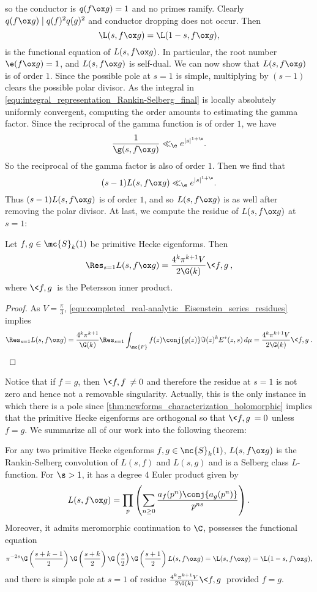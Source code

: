       so the conductor is $q(f \ox g) = 1$ and no primes ramify. Clearly $q(f \ox g) \mid q(f)^{2}q(g)^{2}$ and conductor dropping does not occur. Then
      \[
        \L(s,f \ox g) = \L(1-s,f \ox g),
      \]
      is the functional equation of $L(s,f \ox g)$. In particular, the root number $\e(f \ox g) = 1$, and $L(s,f \ox g)$ is self-dual. We can now show that $L(s,f \ox g)$ is of order $1$. Since the possible pole at $s = 1$ is simple, multiplying by $(s-1)$ clears the possible polar divisor. As the integral in \cref{equ:integral_representation_Rankin-Selberg_final} is locally absolutely uniformly convergent, computing the order amounts to estimating the gamma factor. Since the reciprocal of the gamma function is of order $1$, we have
      \[
        \frac{1}{\g(s,f \ox g)} \ll_{\e} e^{|s|^{1+\e}}.
      \]
      So the reciprocal of the gamma factor is also of order $1$. Then we find that
      \[
        (s-1)L(s,f \ox g) \ll_{\e} e^{|s|^{1+\e}}.
      \]
      Thus $(s-1)L(s,f \ox g)$ is of order $1$, and so $L(s,f \ox g)$ is as well after removing the polar divisor. At last, we compute the residue of $L(s,f \ox g)$ at $s = 1$:

      \begin{proposition}
        Let $f,g \in \mc{S}_{k}(1)$ be primitive Hecke eigenforms. Then
        \[
          \Res_{s = 1}L(s,f \ox g) = \frac{4^{k}\pi^{k+1}V}{2\G(k)}\<f,g\>,
        \]
        where $\<f,g\>$ is the Petersson inner product.
      \end{proposition}
      \begin{proof}
        As $V = \frac{\pi}{3}$, \cref{equ:completed_real-analytic_Eisenstein_series_residues} implies
        \[
          \Res_{s = 1}L(s,f \ox g) = \frac{4^{k}\pi^{k+1}}{\G(k)}\Res_{s = 1}\int_{\mc{F}}f(z)\conj{g(z)}\Im(z)^{k}E^{\ast}(z,s)\,d\mu = \frac{4^{k}\pi^{k+1}V}{2\G(k)}\<f,g\>.
        \]
      \end{proof}

      Notice that if $f = g$, then $\<f,f\> \neq 0$ and therefore the residue at $s = 1$ is not zero and hence not a removable singularity. Actually, this is the only instance in which there is a pole since \cref{thm:newforms_characterization_holomorphic} implies that the primitive Hecke eigenforms are orthogonal so that $\<f,g\> = 0$ unless $f = g$. We summarize all of our work into the following theorem:

      \begin{theorem}
        For any two primitive Hecke eigenforms $f,g \in \mc{S}_{k}(1)$, $L(s,f \ox g)$ is the Rankin-Selberg convolution of $L(s,f)$ and $L(s,g)$ and is a Selberg class $L$-function. For $\s > 1$, it has a degree $4$ Euler product given by
        \[
          L(s,f \ox g) = \prod_{p}\left(\sum_{n \ge 0}\frac{a_{f}(p^{n})\conj{a_{g}(p^{n})}}{p^{ns}}\right).
        \]
        Moreover, it admits meromorphic continuation to $\C$, possesses the functional equation
        \[
          \pi^{-2s}\G\left(\frac{s+k-1}{2}\right)\G\left(\frac{s+k}{2}\right)\G\left(\frac{s}{2}\right)\G\left(\frac{s+1}{2}\right)L(s,f \ox g) = \L(s,f \ox g) = \L(1-s,f \ox g),
        \]
        and there is simple pole at $s = 1$ of residue $\frac{4^{k}\pi^{k+1}V}{2\G(k)}\<f,g\>$ provided $f = g$.
      \end{theorem}
